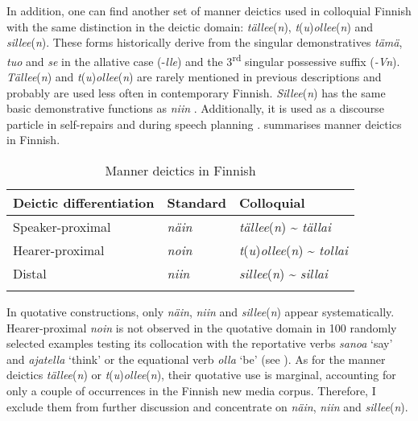 \documentclass[output=paper,colorlinks,citecolor=brown]{langscibook}
\begin{document}
In addition, one can find another set of manner deictics used in colloquial Finnish \citep[§721]{HakulinenEtAl2004} with the same distinction in the deictic domain: \textit{tällee}(\textit{n}), \textit{t}(\textit{u})\textit{ollee}(\textit{n}) and \textit{sillee}(\textit{n}). These forms historically derive from the singular demonstratives \textit{tämä}, \textit{tuo} and \textit{se} in the allative case (-\textit{lle}) and the 3\textsuperscript{rd} singular possessive suffix (\textit{-Vn}). \textit{Tällee}(\textit{n}) and \textit{t}(\textit{u})\textit{ollee}(\textit{n}) are rarely mentioned in previous descriptions and probably are used less often in contemporary Finnish. \textit{Sillee}(\textit{n}) has the same basic demonstrative functions as \textit{niin} \citep[§1160]{HakulinenEtAl2004}. Additionally, it is used as a discourse particle in self-repairs and during speech planning \citep[§861]{HakulinenEtAl2004}.  summarises manner deictics in Finnish.

\begin{table}
\begin{tabularx}{\textwidth}{XXl}
\lsptoprule
\textbf{Deictic differentiation} & \textbf{Standard} & \textbf{Colloquial}\\
\midrule
Speaker-proximal & \textit{näin} & \textit{tällee}(\textit{n}) {\textasciitilde} \textit{tällai}\\
Hearer-proximal & \textit{noin} & \textit{t}(\textit{u})\textit{ollee}(\textit{n}) {\textasciitilde} \textit{tollai}\\
Distal & \textit{niin} & \textit{sillee}(\textit{n}) {\textasciitilde} \textit{sillai}\\
\lspbottomrule
\end{tabularx}
\caption{Manner deictics in Finnish}\label{tab:teptiuk:1}
\end{table}

In quotative constructions, only \textit{näin}, \textit{niin} and \textit{sillee}(\textit{n}) appear systematically. Hearer-proximal \textit{noin} is not observed in the quotative domain in 100 randomly selected examples testing its collocation with the reportative verbs \textit{sanoa} ‘say’ and \textit{ajatella} ‘think’ or the equational verb \textit{olla} ‘be’ (see ). As for the manner deictics \textit{tällee}(\textit{n}) or \textit{t}(\textit{u})\textit{ollee}(\textit{n}), their quotative use is marginal, accounting for only a couple of occurrences in the Finnish new media corpus. Therefore, I exclude them from further discussion and concentrate on \textit{näin}, \textit{niin} and \textit{sillee}(\textit{n}).
\end{document}
